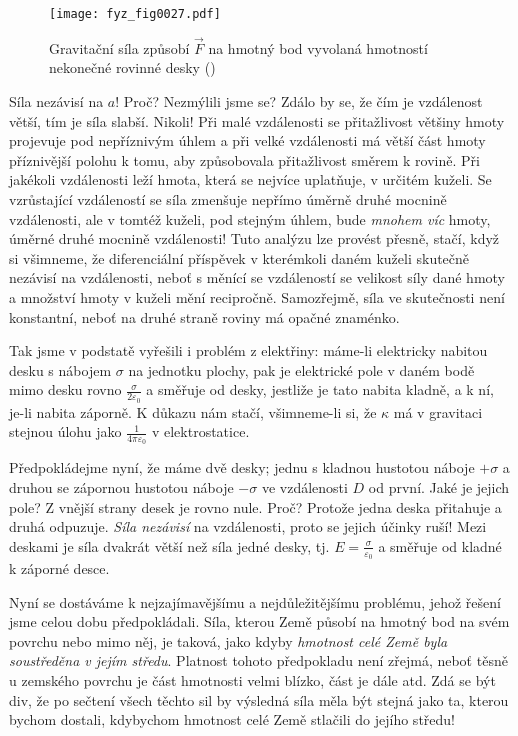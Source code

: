    \begin{figure}[ht!]  %
      \centering
      \texttt{[image: fyz\_fig0027.pdf]}
      \caption{Gravitační síla způsobí \(\vec{F}\) na hmotný bod vyvolaná hmotností nekonečné 
               rovinné desky (\cite[s.~195]{Feynman01})}
      \label{fyz:fig0027}
    \end{figure}
    Síla nezávisí na \(a\)! Proč? Nezmýlili jsme se? Zdálo by se, že čím je vzdálenost větší, tím 
    je síla slabší. Nikoli! Při malé vzdálenosti se přitažlivost většiny hmoty projevuje pod 
    nepříznivým úhlem a při velké vzdálenosti má větší část hmoty příznivější polohu k tomu, aby 
    způsobovala přitažlivost směrem k rovině. Při jakékoli vzdálenosti leží hmota, která se nejvíce 
    uplatňuje, v určitém kuželi. Se vzrůstající vzdáleností se síla zmenšuje nepřímo úměrně druhé 
    mocnině vzdálenosti, ale v tomtéž kuželi, pod stejným úhlem, bude \emph{mnohem víc} hmoty, 
    úměrné druhé mocnině vzdálenosti! Tuto analýzu lze provést přesně, stačí, když si všimneme, že 
    diferenciální příspěvek v kterémkoli daném kuželi skutečně nezávisí na vzdálenosti, neboť s 
    měnící se vzdáleností se velikost síly dané hmoty a množství hmoty v kuželi mění recipročně. 
    Samozřejmě, síla ve skutečnosti není konstantní, neboť na druhé straně roviny má opačné 
    znaménko.
    
   Tak jsme v podstatě vyřešili i problém z elektřiny: máme-li elektricky nabitou desku s nábojem 
    \(\sigma\) na jednotku plochy, pak je elektrické pole v daném bodě mimo desku rovno 
    \(\frac{\sigma}{2\varepsilon_0}\) a směřuje od desky, jestliže je tato nabita kladně, a k ní, 
    je-li nabita záporně. K důkazu nám stačí, všimneme-li si, že \(\kappa\) má v gravitaci stejnou 
    úlohu jako \(\frac{1}{4\pi\varepsilon_0}\) v elektrostatice.
    
    Předpokládejme nyní, že máme dvě desky; jednu s kladnou hustotou náboje \(+\sigma\) a druhou se 
    zápornou hustotou náboje \(-\sigma\) ve vzdálenosti \(D\) od první. Jaké je jejich pole? Z 
    vnější strany desek je rovno nule. Proč? Protože jedna deska přitahuje a druhá odpuzuje. 
    \emph{Síla nezávisí} na vzdálenosti, proto se jejich účinky ruší! Mezi deskami je síla dvakrát 
    větší než síla jedné desky, tj. \(E = \frac{\sigma}{\varepsilon_0}\) a směřuje od kladné k 
    záporné desce.
    
    Nyní se dostáváme k nejzajímavějšímu a nejdůležitějšímu problému, jehož řešení jsme celou dobu 
    předpokládali. Síla, kterou Země působí na hmotný bod na svém povrchu nebo mimo něj, je taková, 
    jako kdyby \emph{hmotnost celé Země byla soustředěna v jejím středu}. Platnost tohoto 
    předpokladu není zřejmá, neboť těsně u zemského povrchu je část hmotnosti velmi blízko, část je 
    dále atd. Zdá se být div, že po sečtení všech těchto sil by výsledná síla měla být stejná jako 
    ta, kterou bychom dostali, kdybychom hmotnost celé Země stlačili do jejího středu!
    
